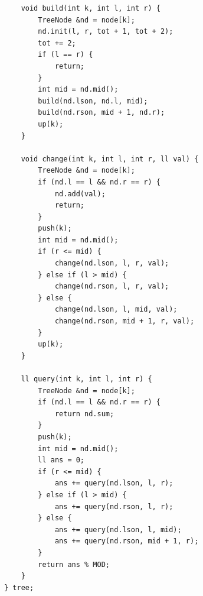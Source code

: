 \documentclass[twoside]{article}
\begin{document}
\begin{lstlisting}
    void build(int k, int l, int r) {
        TreeNode &nd = node[k];
        nd.init(l, r, tot + 1, tot + 2);
        tot += 2;
        if (l == r) {
            return;
        }
        int mid = nd.mid();
        build(nd.lson, nd.l, mid);
        build(nd.rson, mid + 1, nd.r);
        up(k);
    }

    void change(int k, int l, int r, ll val) {
        TreeNode &nd = node[k];
        if (nd.l == l && nd.r == r) {
            nd.add(val);
            return;
        }
        push(k);
        int mid = nd.mid();
        if (r <= mid) {
            change(nd.lson, l, r, val);
        } else if (l > mid) {
            change(nd.rson, l, r, val);
        } else {
            change(nd.lson, l, mid, val);
            change(nd.rson, mid + 1, r, val);
        }
        up(k);
    }

    ll query(int k, int l, int r) {
        TreeNode &nd = node[k];
        if (nd.l == l && nd.r == r) {
            return nd.sum;
        }
        push(k);
        int mid = nd.mid();
        ll ans = 0;
        if (r <= mid) {
            ans += query(nd.lson, l, r);
        } else if (l > mid) {
            ans += query(nd.rson, l, r);
        } else {
            ans += query(nd.lson, l, mid);
            ans += query(nd.rson, mid + 1, r);
        }
        return ans % MOD;
    }
} tree;\end{lstlisting}
\end{document}
